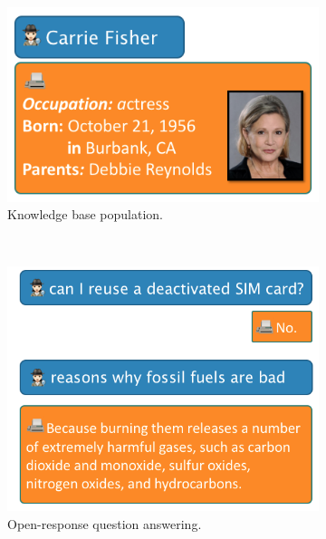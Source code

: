 \begin{figure}
  \centering
  \begin{subfigure}{0.45\textwidth}
    \includegraphics[width=\textwidth]{figures/overview-kbp}
    \caption{\label{fig:intro:overview-kbp} Knowledge base population.}
  \end{subfigure} \\
  \begin{subfigure}{0.55\textwidth}%
    \includegraphics[width=\textwidth]{figures/overview-qa}
    \caption{\label{fig:intro:overview-qa} Open-response question answering.}
  \end{subfigure} \\
  \begin{subfigure}{0.55\textwidth}

\end{subfigure}
\end{figure}
